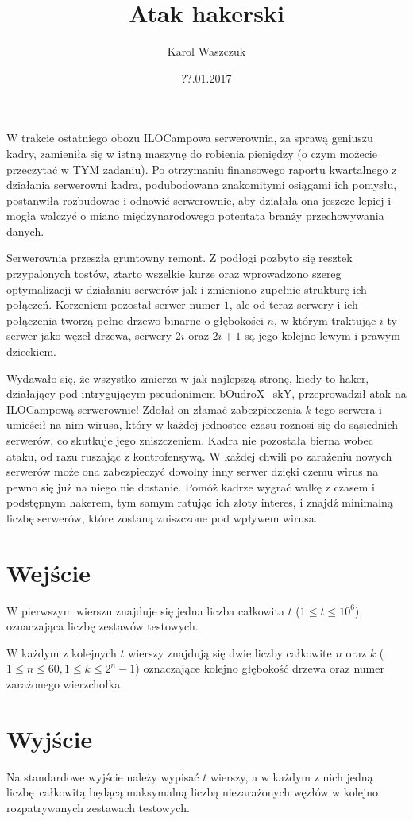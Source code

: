 \documentclass[zad,zawodnik,utf8]{sinol}
\title{Atak hakerski}
\author{Karol Waszczuk} %
\date{??.01.2017}
\begin{document}
\begin{tasktext}%

W trakcie ostatniego obozu ILOCampowa serwerownia, za sprawą geniuszu kadry, zamieniła się w istną maszynę do robienia pieniędzy (o czym możecie przeczytać w \href{http://www.ilocamp14.ilo.pl/pliki/srw.pdf}{TYM} zadaniu). Po otrzymaniu finansowego raportu kwartalnego z działania serwerowni kadra, podubodowana znakomitymi osiągami ich pomysłu, postanwiła rozbudowac i odnowić serwerownie, aby działała ona jeszcze lepiej i mogła walczyć o miano międzynarodowego potentata branży przechowywania danych.

Serwerownia przeszła gruntowny remont. Z podłogi pozbyto się resztek przypalonych tostów, ztarto wszelkie kurze oraz wprowadzono szereg optymalizacji w działaniu serwerów jak i zmieniono zupełnie strukturę ich połączeń. Korzeniem pozostał serwer numer $1$, ale od teraz serwery i ich połączenia tworzą pełne drzewo binarne o głębokości $n$, w którym traktując $i$-ty serwer jako węzeł drzewa, serwery $2i$ oraz $2i + 1$ są jego kolejno lewym i prawym dzieckiem. 

Wydawało się, że wszystko zmierza w jak najlepszą stronę, kiedy to haker, działający pod intrygującym pseudonimem bOudroX\_skY, przeprowadził atak na ILOCampową serwerownie! Zdołał on złamać zabezpieczenia $k$-tego serwera i umieścił na nim wirusa, który w każdej jednostce czasu roznosi się do sąsiednich serwerów, co skutkuje jego zniszczeniem. Kadra nie pozostała bierna wobec ataku, od razu ruszając z kontrofensywą. W każdej chwili po zarażeniu nowych serwerów może ona zabezpieczyć dowolny inny serwer dzięki czemu wirus na pewno się już na niego nie dostanie. Pomóż kadrze wygrać walkę z czasem i podstępnym hakerem, tym samym ratując ich złoty interes, i znajdź minimalną liczbę serwerów, które zostaną zniszczone pod wpływem wirusa. 

  \section{Wejście}
W pierwszym wierszu znajduje się jedna liczba całkowita $t$ ($1 \leq t \leq 10^6$), oznaczająca liczbę zestawów testowych.

W każdym z kolejnych $t$ wierszy znajdują się dwie liczby całkowite $n$ oraz $k$ ($1 \leq n \leq 60, 1 \leq k \leq 2^n - 1$) oznaczające kolejno głębokość drzewa oraz numer zarażonego wierzchołka. 

  \section{Wyjście}
Na standardowe wyjście należy wypisać $t$ wierszy, a w każdym z nich jedną liczbę całkowitą będącą maksymalną liczbą niezarażonych węzłów w kolejno rozpatrywanych zestawach testowych.

\makecompactexample
\end{tasktext}
\end{document}

